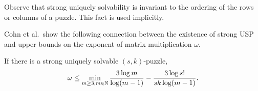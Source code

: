 \documentclass[11pt]{article}
\newcommand\Sym[1]{\ensuremath{\mathrm{Sym}_{#1}}}
\begin{document}
\noindent Observe that strong uniquely solvability is invariant to the ordering of the rows or columns of a
puzzle.  This fact is used implicitly.

Cohn et al.~show the following connection between the existence of
strong USP and upper bounds on the exponent of
matrix multiplication $\omega$.
\begin{lemma}
  \label{lem:omega}
  If there is a strong uniquely solvable $(s,k)$-puzzle,
  $$\omega \le \min_{m \ge 3, m \in \mathbb{N}} \frac{3 \log
    m}{\log(m-1)} - \frac{3 \log s!}{sk \log(m-1)}.$$
\end{lemma}

\end{document}
